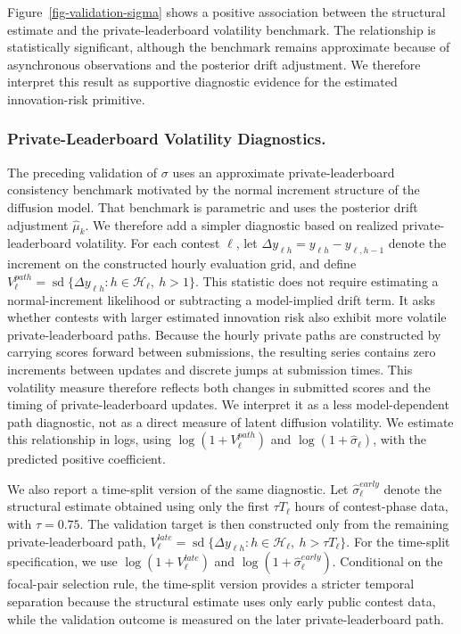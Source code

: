 \documentclass[mnsc]{informs3}
\begin{document}
Figure~\ref{fig-validation-sigma} shows a positive association between the structural estimate and the private-leaderboard volatility benchmark. The relationship is statistically significant, although the benchmark remains approximate because of asynchronous observations and the posterior drift adjustment. We therefore interpret this result as supportive diagnostic evidence for the estimated innovation-risk primitive.

\subsubsection{Private-Leaderboard Volatility Diagnostics.}
The preceding validation of $\sigma$ uses an approximate private-leaderboard consistency benchmark motivated by the normal increment structure of the diffusion model.
That benchmark is parametric and uses the posterior drift adjustment $\hat\mu_k$.
We therefore add a simpler diagnostic based on realized private-leaderboard volatility.
For each contest $\ell$, let $\Delta y_{\ell h}=y_{\ell h}-y_{\ell,h-1}$ denote the increment on the constructed hourly evaluation grid, and define $V_\ell^{path}=\operatorname{sd}\{\Delta y_{\ell h}:h\in\mathcal H_\ell,\ h>1\}$.
This statistic does not require estimating a normal-increment likelihood or subtracting a model-implied drift term.
It asks whether contests with larger estimated innovation risk also exhibit more volatile private-leaderboard paths.
Because the hourly private paths are constructed by carrying scores forward between submissions, the resulting series contains zero increments between updates and discrete jumps at submission times. This volatility measure therefore reflects both changes in submitted scores and the timing of private-leaderboard updates. We interpret it as a less model-dependent path diagnostic, not as a direct measure of latent diffusion volatility.
We estimate this relationship in logs, using $\log(1+V_\ell^{path})$ and $\log(1+\hat\sigma_\ell)$, with the predicted positive coefficient.

We also report a time-split version of the same diagnostic.
Let $\hat\sigma_\ell^{early}$ denote the structural estimate obtained using only the first $\tau T_\ell$ hours of contest-phase data, with $\tau=0.75$.
The validation target is then constructed only from the remaining private-leaderboard path, $V_\ell^{late}=\operatorname{sd}\{\Delta y_{\ell h}:h\in\mathcal H_\ell,\ h>\tau T_\ell\}$.
For the time-split specification, we use $\log(1+V_\ell^{late})$ and $\log(1+\hat\sigma_\ell^{early})$.
Conditional on the focal-pair selection rule, the time-split version provides a stricter temporal separation because the structural estimate uses only early public contest data, while the validation outcome is measured on the later private-leaderboard path.
\end{document}
